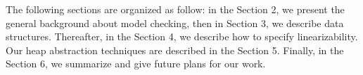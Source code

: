 The following sections are organized as follow: in the Section 2, we present the general background about model checking, then in Section 3, we describe data structures. Thereafter, in the Section 4, we describe how to specify linearizability.  Our heap abstraction techniques are described in the Section 5. Finally, in the Section 6, we summarize and give future plans for our work.

